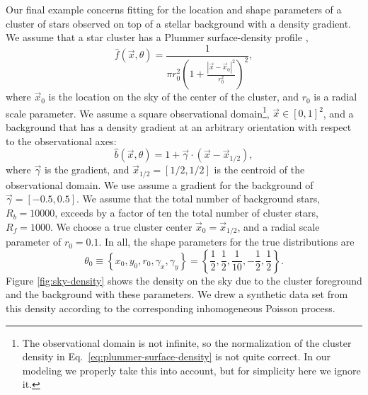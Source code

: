 \documentclass[aps,prd]{revtex4-1}
\begin{document}
Our final example concerns fitting for the location and shape
parameters of a cluster of stars observed on top of a stellar
background with a density gradient.  We assume that a star cluster has
a Plummer surface-density profile \citep{Plummer1911,Aarseth1974},
\begin{equation}
  \label{eq:plummer-surface-density}
  \hat{f}(\vec{x}, \theta) = \frac{1}{\pi r_0^2 \left( 1 + \frac{\left|
          \vec{x} - \vec{x}_0 \right|^2}{r_0^2} \right)^2},
\end{equation}
where $\vec{x}_0$ is the location on the sky of the center of the
cluster, and $r_0$ is a radial scale parameter.  We assume a square
observational domain\footnote{The observational domain is not
  infinite, so the normalization of the cluster density in
  Eq.~\eqref{eq:plummer-surface-density} is not quite correct.  In our
  modeling we properly take this into account, but for simplicity here
  we ignore it.}, $\vec{x} \in [0,1]^2$, and a background that has a
density gradient at an arbitrary orientation with respect to the
observational axes:
\begin{equation}
  \hat{b}\left(\vec{x}, \theta\right) = 1 + \vec{\gamma} \cdot \left( \vec{x}
    - \vec{x}_{1/2} \right),
\end{equation}
where $\vec{\gamma}$ is the gradient, and $\vec{x}_{1/2} = [1/2, 1/2]$
is the centroid of the observational domain.  We use assume a gradient
for the background of $\vec{\gamma} = [-0.5, 0.5]$.  We assume that
the total number of background stars, $R_b = 10000$, exceeds by a
factor of ten the total number of cluster stars, $R_f = 1000$.  We
choose a true cluster center $\vec{x}_0 = \vec{x}_{1/2}$, and a radial
scale parameter of $r_0 = 0.1$.  In all, the shape parameters for the
true distributions are
\begin{equation}
\label{eq:true-cluster-parameters}
\theta_0 \equiv \left\{ x_0, y_0, r_0, \gamma_x, \gamma_y \right\} =
\left\{ \frac{1}{2}, \frac{1}{2}, \frac{1}{10}, -\frac{1}{2},
  \frac{1}{2} \right\}.
\end{equation}
Figure \ref{fig:sky-density} shows the density on the sky due to the
cluster foreground and the background with these parameters.  We drew
a synthetic data set from this density according to the corresponding
inhomogeneous Poisson process.
\end{document}
